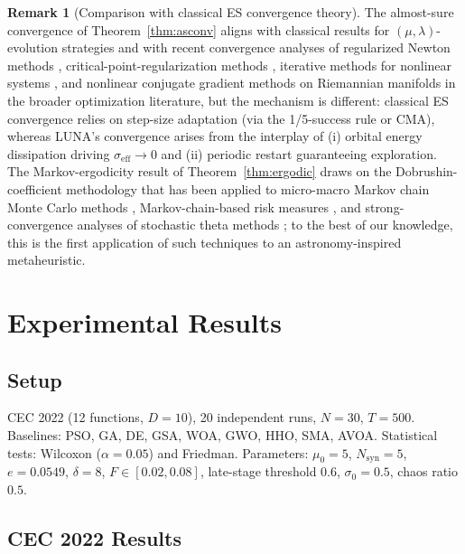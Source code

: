 \documentclass[review]{elsarticle}
\theoremstyle{definition}
\newtheorem{remark}{Remark}
\begin{document}
\begin{remark}[Comparison with classical ES convergence theory]
The almost-sure convergence of Theorem~\ref{thm:asconv} aligns with classical results for $(\mu,\lambda)$-evolution strategies \cite{amc18} and with recent convergence analyses of regularized Newton methods \cite{amcrec1}, critical-point-regularization methods \cite{amcrec2}, iterative methods for nonlinear systems \cite{amcrec16}, and nonlinear conjugate gradient methods on Riemannian manifolds \cite{amcrec17} in the broader optimization literature, but the mechanism is different: classical ES convergence relies on step-size adaptation (via the 1/5-success rule or CMA), whereas LUNA's convergence arises from the interplay of (i) orbital energy dissipation driving $\sigma_{\mathrm{eff}}\to 0$ and (ii) periodic restart guaranteeing exploration. The Markov-ergodicity result of Theorem~\ref{thm:ergodic} draws on the Dobrushin-coefficient methodology that has been applied to micro-macro Markov chain Monte Carlo methods \cite{amcrec3}, Markov-chain-based risk measures \cite{amcrec4}, and strong-convergence analyses of stochastic theta methods \cite{amcrec15}; to the best of our knowledge, this is the first application of such techniques to an astronomy-inspired metaheuristic.
\end{remark}

\section{Experimental Results}
\label{sec:results}

\subsection{Setup}

CEC 2022 (12 functions, $D=10$), 20 independent runs, $N=30$, $T=500$. Baselines: PSO, GA, DE, GSA, WOA, GWO, HHO, SMA, AVOA. Statistical tests: Wilcoxon ($\alpha=0.05$) and Friedman. Parameters: $\mu_0=5$, $N_{\mathrm{syn}}=5$, $e=0.0549$, $\delta=8$, $F \in [0.02, 0.08]$, late-stage threshold $0.6$, $\sigma_0=0.5$, chaos ratio $0.5$.

\subsection{CEC 2022 Results}
\end{document}
